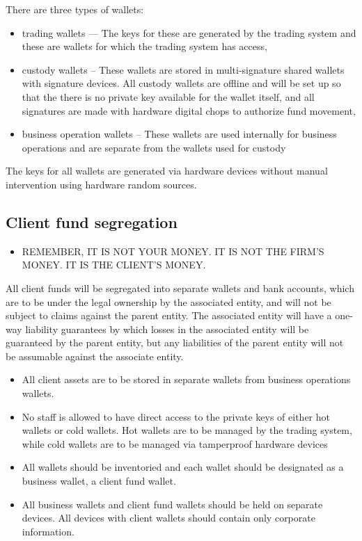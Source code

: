 There are three types of wallets:
\begin{itemize}
  \item trading wallets — The keys for these are generated by the
    trading system and these are wallets for which the trading system
    has access,
  \item custody wallets – These wallets are stored in multi-signature
    shared wallets with signature devices.  All custody wallets are
    offline and will be set up so that the there is no private key
    available for the wallet itself, and all signatures are made with
    hardware digital chops to authorize fund movement,
  \item business operation wallets – These wallets are used internally
    for business operations and are separate from the wallets used for
    custody
\end{itemize}

The keys for all wallets are generated via hardware devices without
manual intervention using hardware random sources. 

\subsection{Client fund segregation}
\begin{itemize}
\item REMEMBER, IT IS NOT YOUR MONEY.  IT IS NOT THE FIRM'S MONEY.  IT IS THE CLIENT'S MONEY.
\end{itemize}

All client funds will be segregated into separate wallets and bank
accounts, which are to be under the legal ownership by the associated
entity, and will not be subject to claims against the parent entity.
The associated entity will have a one-way liability guarantees by
which losses in the associated entity will be guaranteed by the parent
entity, but any liabilities of the parent entity will not be assumable
against the associate entity.

\begin{itemize}
  \item All client assets are to be stored in separate wallets from
    business operations wallets.
  \item No staff is allowed to have direct access to the private keys
    of either hot
    wallets or cold wallets.  Hot wallets are to be managed by the
    trading system, while cold wallets are to be managed via
    tamperproof hardware devices 
  \item All wallets should be inventoried and each wallet should be designated
    as a business wallet, a client fund wallet.
  \item All business wallets and client fund wallets should be held on
separate devices.  All devices with client wallets should contain only
corporate information.
\end{itemize}

